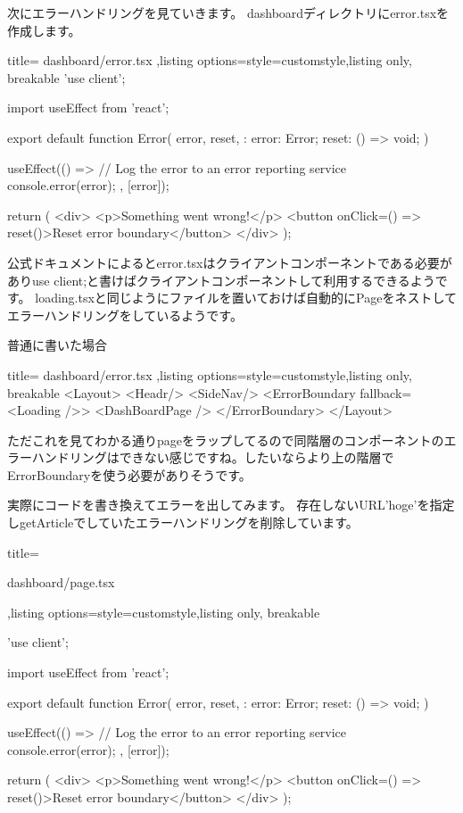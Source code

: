 次にエラーハンドリングを見ていきます。
dashboardディレクトリにerror.tsxを作成します。


\begin{tcblisting}{title={
        dashboard/error.tsx
      },listing options={style=customstyle},listing only, breakable}
'use client';

import { useEffect } from 'react';

export default function Error({
  error,
  reset,
}: {
  error: Error;
  reset: () => void;
  }) {
  useEffect(() => {
  // Log the error to an error reporting service
  console.error(error);
  }, [error]);

  return (
  <div>
    <p>Something went wrong!</p>
    <button onClick={() => reset()}>Reset error boundary</button>
  </div>
  );
}
\end{tcblisting}



公式ドキュメントによるとerror.tsxはクライアントコンポーネントである必要がありuse client;と書けばクライアントコンポーネントして利用するできるようです。
loading.tsxと同じようにファイルを置いておけば自動的にPageをネストしてエラーハンドリングをしているようです。

普通に書いた場合


\begin{tcblisting}{title={
  dashboard/error.tsx
},listing options={style=customstyle},listing only, breakable}
<Layout>
    <Headr/>
    <SideNav/>
    <ErrorBoundary fallback={<Loading />}>
      <DashBoardPage />
    </ErrorBoundary>
</Layout>
\end{tcblisting}



ただこれを見てわかる通りpageをラップしてるので同階層のコンポーネントのエラーハンドリングはできない感じですね。したいならより上の階層でErrorBoundaryを使う必要がありそうです。

実際にコードを書き換えてエラーを出してみます。
存在しないURL'hoge'を指定しgetArticleでしていたエラーハンドリングを削除しています。


\begin{tcblisting}{title={

        dashboard/page.tsx
      },listing options={style=customstyle},listing only, breakable}

'use client';

import { useEffect } from 'react';
      
export default function Error({
  error,
  reset,
}: {
  error: Error;
  reset: () => void;
}) {
  useEffect(() => {
    // Log the error to an error reporting service
    console.error(error);
  }, [error]);
      
  return (
    <div>
      <p>Something went wrong!</p>
      <button onClick={() => reset()}>Reset error boundary</button>
    </div>
  );
}

\end{tcblisting}


